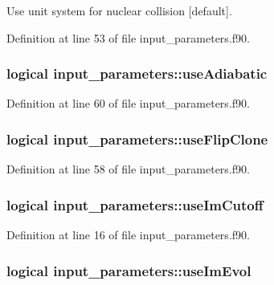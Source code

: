 Use unit system for nuclear collision \mbox{[}default\mbox{]}. 



Definition at line 53 of file input\_\-parameters.f90.

\hypertarget{namespaceinput__parameters_ac1165234d614ad278effaf2a7910888b}{
\subsubsection[{useAdiabatic}]{\setlength{\rightskip}{0pt plus 5cm}logical {\bf input\_\-parameters::useAdiabatic}}}
\label{namespaceinput__parameters_ac1165234d614ad278effaf2a7910888b}


Definition at line 60 of file input\_\-parameters.f90.

\hypertarget{namespaceinput__parameters_a504b6e2c93e4a4af47125d83d6e5d75d}{
\subsubsection[{useFlipClone}]{\setlength{\rightskip}{0pt plus 5cm}logical {\bf input\_\-parameters::useFlipClone}}}
\label{namespaceinput__parameters_a504b6e2c93e4a4af47125d83d6e5d75d}


Definition at line 58 of file input\_\-parameters.f90.

\hypertarget{namespaceinput__parameters_aa73f50863135132e72d9a9c93d2cadef}{
\subsubsection[{useImCutoff}]{\setlength{\rightskip}{0pt plus 5cm}logical {\bf input\_\-parameters::useImCutoff}}}
\label{namespaceinput__parameters_aa73f50863135132e72d9a9c93d2cadef}


Definition at line 16 of file input\_\-parameters.f90.

\hypertarget{namespaceinput__parameters_a9672a1c90e65a2ecee350dd2dae64e03}{
\subsubsection[{useImEvol}]{\setlength{\rightskip}{0pt plus 5cm}logical {\bf input\_\-parameters::useImEvol}}}
\label{namespaceinput__parameters_a9672a1c90e65a2ecee350dd2dae64e03}


